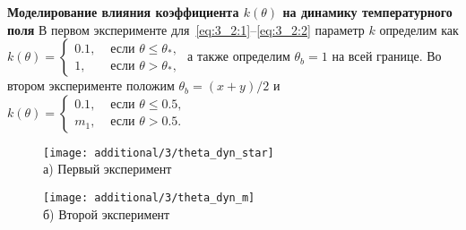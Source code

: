 \begin{frame}
    \textbf{Моделирование влияния коэффициента $k(\theta)$ на динамику температурного поля}
    В первом эксперименте для~\eqref{eq:3_2:1}--\eqref{eq:3_2:2} параметр $k$ определим как
    $ k(\theta)=
    \begin{cases}
        0.1, & \text { если } \theta \leq \theta_{*}, \\
        1, & \text { если } \theta>\theta_{*},
    \end{cases}
    $
    а также определим $\theta_b = 1$ на всей границе.
    Во втором эксперименте положим $\theta_b = (x + y) /2$ и
    $k(\theta)=
    \begin{cases}
        0.1, & \text { если } \theta \leq 0.5, \\
        m_1, & \text { если } \theta > 0.5.
    \end{cases}
    $
    \begin{figure}[h!t]
        \begin{minipage}[b][][b]{0.49\linewidth}
            \centering
            \texttt{[image: additional/3/theta\_dyn\_star]} \\ а) Первый эксперимент
        \end{minipage}
        \hfill
        \begin{minipage}[b][][b]{0.49\linewidth}
            \centering
            \texttt{[image: additional/3/theta\_dyn\_m]} \\ б) Второй эксперимент
        \end{minipage}\label{fig:figure~~}
    \end{figure}
\end{frame}
